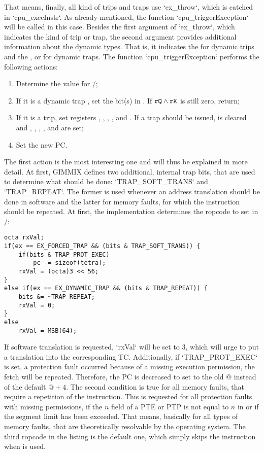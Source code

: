 That means, finally, all kind of trips and traps use `ex_throw`, which is catched in `cpu_execInstr`. As already mentioned, the function `cpu_triggerException` will be called in this case. Besides the first argument of `ex_throw`, which indicates the kind of trip or trap, the second argument provides additional information about the dynamic types. That is, it indicates the  for dynamic trips and the ,  or  for dynamic traps. The function `cpu_triggerException` performs the following actions:
\begin{enumerate}
	\item Determine the value for /;
	\item If it is a dynamic trap , set the bit(s) in . If ${\tt rQ} \land {\tt rK}$ is still zero, return;
	\item If it is a trip, set registers , , , ,  and . If a trap should be issued,  is cleared and , , , ,  and  are set;
	\item Set the new \gls{PC}.
\end{enumerate}
The first action is the most interesting one and will thus be explained in more detail. At first, GIMMIX defines two additional, internal trap bits, that are used to determine what should be done: `TRAP_SOFT_TRANS` and `TRAP_REPEAT`. The former is used whenever an address translation should be done in software and the latter for memory faults, for which the instruction should be repeated. At first, the implementation determines the ropcode to set in /:
\begin{lstlisting}[language=GIMMIXC,caption={Determining \sr{X}/\sr{XX} in {\tt cpu\_triggerException}, part 1}]
octa rxVal;
if(ex == EX_FORCED_TRAP && (bits & TRAP_SOFT_TRANS)) {
	if(bits & TRAP_PROT_EXEC)
		pc -= sizeof(tetra);
	rxVal = (octa)3 << 56;
}
else if(ex == EX_DYNAMIC_TRAP && (bits & TRAP_REPEAT)) {
	bits &= ~TRAP_REPEAT;
	rxVal = 0;
}
else
	rxVal = MSB(64);
\end{lstlisting}
If software translation is requested, `rxVal` will be set to 3, which will urge  to put a translation into the corresponding TC. Additionally, if `TRAP_PROT_EXEC` is set, \ie a protection fault occurred because of a missing execution permission, the fetch will be repeated. Therefore, the \gls{PC} is decreased to set  to the old $@$ instead of the default $@+4$. The second condition is true for all memory faults, that require a repetition of the instruction. This is requested for all protection faults with missing permissions, if the $n$ field of a PTE or PTP is not equal to $n$ in  or if the segment limit has been exceeded. That means, basically for all types of memory faults, that are theoretically resolvable by the operating system. The third ropcode in the listing is the default one, which simply skips the instruction when  is used.
 

